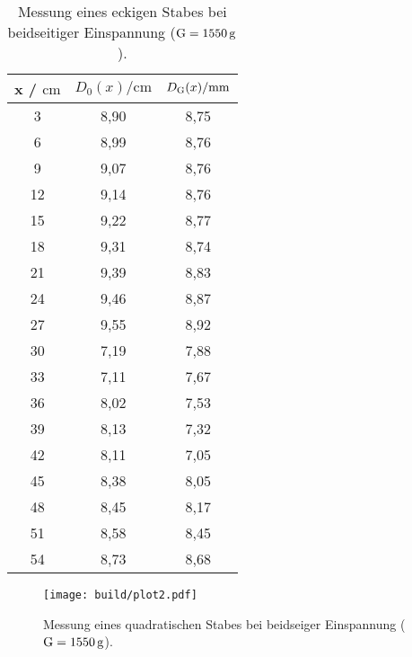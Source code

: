 \sloppy
\begin{table}[H]
  \centering
  \caption{Messung eines eckigen Stabes bei beidseitiger Einspannung ($\text G = \SI{1550}{\gram}$).}
  \label{tab:werte3}
  \begin{tabular}{c c c}
    \toprule
    x / $\si{\centi\meter} $ & $ D_0(x) / \si{\centi\meter}$ & $D_{\text G}(x) / \si{\milli\meter}$ \\
    \midrule
    3 & 8,90 & 8,75 \\
    6 & 8,99 & 8,76 \\
    9 & 9,07 & 8,76 \\
    12 & 9,14 & 8,76 \\
    15 & 9,22 & 8,77 \\
    18 & 9,31 & 8,74 \\
    21 & 9,39 & 8,83 \\
    24 & 9,46 & 8,87 \\
    27 & 9,55 & 8,92 \\
    30 & 7,19 & 7,88 \\
    33 & 7,11 & 7,67 \\
    36 & 8,02 & 7,53 \\
    39 & 8,13 & 7,32 \\
    42 & 8,11 & 7,05 \\
    45 & 8,38 & 8,05 \\
    48 & 8,45 & 8,17 \\
    51 & 8,58 & 8,45 \\
    54 & 8,73 & 8,68 \\
    \bottomrule
  \end{tabular}
\end{table}

\sloppy
\begin{figure}
  \centering
  \texttt{[image: build/plot2.pdf]}
  \caption{Messung eines quadratischen Stabes bei beidseiger Einspannung ($\text G = \SI{1550}{\gram}$).}
  \label{fig:plot2}
\end{figure}

